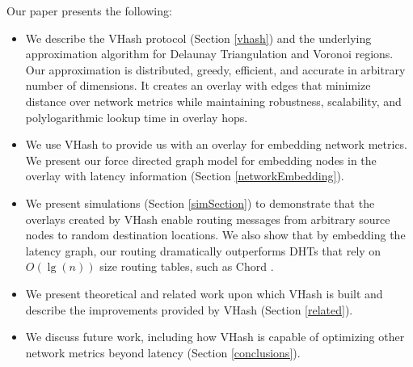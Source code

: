 \documentclass[10pt, conference, letterpaper]{IEEEtran}
\begin{document}
Our paper presents the following:
\begin{itemize}
	\item We describe the VHash protocol (Section \ref{vhash}) and the underlying approximation algorithm for Delaunay Triangulation and Voronoi regions.
    Our approximation is distributed, greedy, efficient, and accurate in arbitrary number of dimensions.
     It creates an overlay with edges that minimize distance over network metrics while maintaining robustness, scalability, and polylogarithmic lookup time in overlay hops.
	\item We use VHash to provide us with an overlay for embedding network metrics.
    We present our force directed graph model for embedding nodes in the overlay with latency information (Section \ref{networkEmbedding}).%
	\item We present simulations (Section \ref{simSection}) to demonstrate that the overlays created by VHash enable routing messages from arbitrary source nodes to random destination locations.
    We also show that by embedding the latency graph, our routing dramatically outperforms DHTs that rely on $O(\lg(n))$ size routing tables, such as Chord \cite{chord}.
	\item We present theoretical and related work upon which VHash is built and describe the improvements provided by VHash (Section \ref{related}).
	\item We discuss future work, including how VHash is capable of optimizing other network metrics beyond latency (Section \ref{conclusions}).
\end{itemize}

\end{document}
